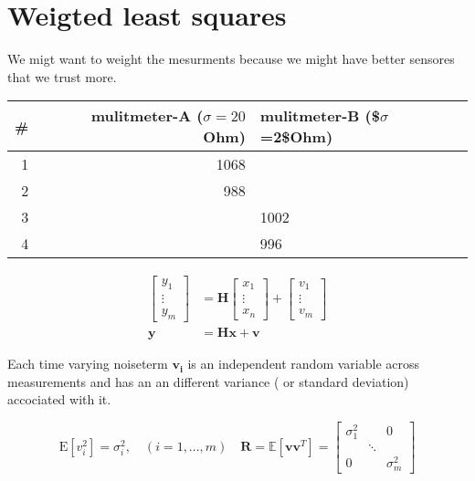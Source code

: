 \documentclass[a4paper]{article}
\begin{document}
\newpage

\section{Weigted least squares}
\label{sec-2}

We migt want to weight the mesurments because we might have better
sensores that we trust more.

\begin{center}
\begin{tabular}{rrl}
\# & mulitmeter-A ($\sigma=20$ Ohm) & mulitmeter-B (\$$\sigma$=2\$Ohm)\\
\hline
1 & 1068 & \\
2 & 988 & \\
3 &  & 1002\\
4 &  & 996\\
\end{tabular}
\end{center}

$$\begin{aligned}\left[\begin{array}{l}{y_{1}} \\ {\vdots} \\ {y_{m}}\end{array}\right] &=\mathbf{H}\left[\begin{array}{c}{x_{1}} \\ {\vdots} \\ {x_{n}}\end{array}\right]+\left[\begin{array}{c}{v_{1}} \\ {\vdots} \\ {v_{m}}\end{array}\right] \\ \mathbf{y} &=\mathbf{H x}+\mathbf{v} \end{aligned}$$

Each time varying noiseterm $\mathbf{v_i}$ is an independent random
variable across measurements and has an an different variance ( or
standard deviation) accociated with it.

$$\mathrm{E}\left[v_{i}^{2}\right]=\sigma_{i}^{2}, \quad(i=1, \ldots, m) \quad \mathbf{R}=\mathbb{E}\left[\mathbf{v} \mathbf{v}^{T}\right]=\left[\begin{array}{ccc}{\sigma_{1}^{2}} & {} & {0} \\ {} & {\ddots} & {} \\ {0} & {} & {\sigma_{m}^{2}}\end{array}\right]$$
\end{document}
